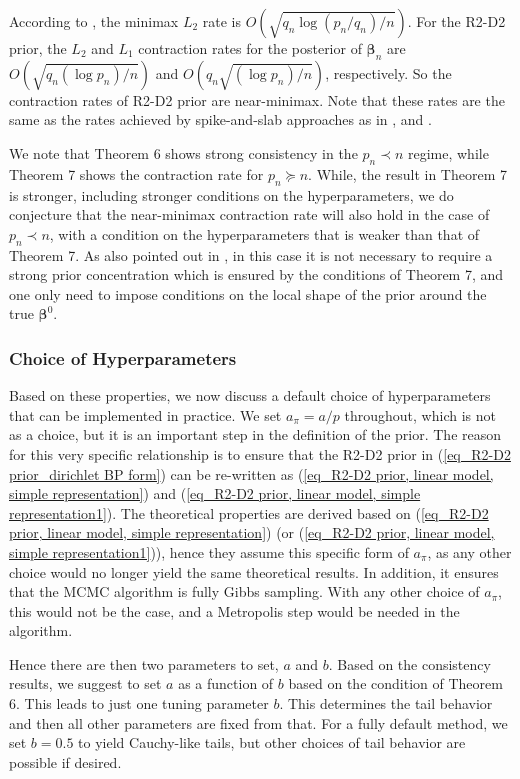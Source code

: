 \documentclass[12pt]{article}
\begin{document}
According to \cite{raskutti2011minimax}, the minimax $L_2$ rate is $O(\sqrt{q_n \log (p_n/q_n)/n})$.
For the R2-D2 prior, the $L_2$ and $L_1$ contraction rates for the posterior of $\bm\beta_n$ are  $O(\sqrt{q_n (\log p_n)/n})$ and $O(q_n\sqrt{ (\log p_n)/n})$, respectively.  So the  contraction rates of R2-D2 prior are near-minimax.
Note that these rates are the same as the rates achieved by spike-and-slab approaches as in  \cite{castillo2015bayesian}, \cite{song2017nearly} and \cite{rovckova2018spike}.

We note that Theorem 6 shows strong consistency in the $p_n \prec n$ regime, while Theorem 7 shows the contraction rate for $p_n\succeq n$. While, the result in Theorem 7 is stronger, including stronger conditions on the hyperparameters, we do conjecture that the near-minimax contraction rate will also hold in the case of $p_n \prec n$, with a condition on the hyperparameters that is weaker than that of Theorem 7. As also pointed out in \cite{song2017nearly}, in this case it is not necessary to require a strong prior concentration which is ensured by the conditions of Theorem 7, and one only need to impose conditions on the local shape of the prior around the true $\mathbf{\beta}^0$.

\subsubsection{Choice of Hyperparameters}
Based on these properties, we now discuss a default choice of hyperparameters that can be implemented in practice. We set $a_\pi = a/p$ throughout, which is not as a choice, but it is an important step in the definition of the prior. The reason for this very specific relationship is to ensure that the R2-D2 prior in  (\ref{eq_R2-D2 prior_dirichlet BP form}) can be re-written as (\ref{eq_R2-D2 prior, linear model, simple representation}) and (\ref{eq_R2-D2 prior, linear model, simple representation1}).
The theoretical properties are derived based on (\ref{eq_R2-D2 prior, linear model, simple representation})  (or (\ref{eq_R2-D2 prior, linear model, simple representation1})), hence they assume this specific form of $a_\pi$, as any other choice would no longer yield the same theoretical results. In addition, it ensures that the MCMC algorithm is fully Gibbs sampling. With any other choice of $a_\pi$, this would not be the case, and a Metropolis step would be needed in the algorithm.

Hence there are then two  parameters to set, $a$ and $b$.  Based on the consistency results, we suggest to set $a$ as a function of $b$ based on the condition of Theorem 6.
This leads to just one tuning parameter $b$. This determines the tail behavior and then all other parameters are fixed from that. For a fully default method, we set $b = 0.5$ to yield Cauchy-like tails, but other choices of tail behavior are possible if desired.
\end{document}
